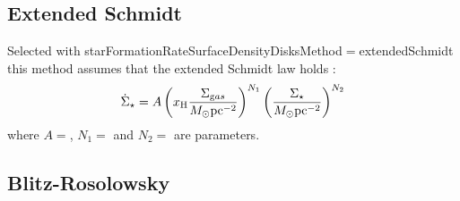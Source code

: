 \subsection{Extended Schmidt}\label{sec:StarFormationExtendedSchmidt}

Selected with {\normalfont \ttfamily starFormationRateSurfaceDensityDisksMethod}$=${\normalfont \ttfamily extendedSchmidt} this method assumes that the extended Schmidt law holds \citep{shi_extended_2011}:
\begin{equation}
\dot{\Sigma}_\star = A \left(x_{\mathrm H} {\Sigma_{\mathrm gas}\over M_\odot \hbox{pc}^{-2}}\right)^{N_1} \left({\Sigma_{\star}\over M_\odot \hbox{pc}^{-2}}\right)^{N_2}
\end{equation}
where $A=${\normalfont \ttfamily [starFormationExtendedSchmidtNormalization]}, $N_1=${\normalfont \ttfamily
[starFormationExtendedSchmidtGasExponent]} and $N_2=${\normalfont \ttfamily [starFormationExtendedSchmidtStarExponent]} are parameters.

\subsection{Blitz-Rosolowsky}\label{sec:StarFormationBlitzRosolowsky}

